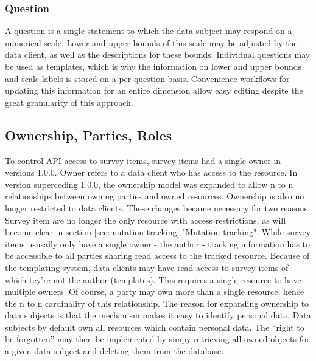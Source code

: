 \documentclass[a4paper,11pt]{article}
\begin{document}
                \subsubsection{Question}
                    A question is a single statement to which the data subject may respond
                    on a numerical scale. Lower and upper bounds of this scale
                    may be adjusted by the data client, as well as the descriptions
                    for these bounds. Individual questions may be used as templates,
                    which is why the information on lower and upper bounds and scale
                    labels is stored on a per-question basis. Convenience workflows
                    for updating this information for an entire dimension allow
                    easy editing despite the great granularity of this approach.

            \subsection{Ownership, Parties, Roles}
                To control API access to survey items, survey items had a single
                owner in versions 1.0.0. Owner refers to a data client who has access
                to the resource. In version superceding 1.0.0, the ownership model
                was expanded to allow n to n relationships between owning parties
                and owned resources. Ownership is also no longer restricted to
                data clients. These changes became necessary for two reasons.
                Survey item are no longer the only resource with access restrictions,
                as will become clear in section \ref{sec:mutation-tracking} "Mutation tracking".
                While survey items ususally only have a single owner - the author - 
                tracking information has to be accessible to all parties sharing
                read access to the tracked resource. Because of the templating system,
                data clients may have read access to survey items of which tey're not
                the author (templates). This requires a single resource to have multiple owners.
                Of course, a party may own more than a single resource, hence the n to n
                cardinality of this relationship. The reason for expanding ownership
                to data subjects is that the mechanism makes it easy to identify personal
                data. Data subjects by default own all resources which contain
                personal data. The ``right to be forgotten'' may then be implemented by
                simpy retrieving all owned objects for a given data subject and deleting 
                them from the database.
\end{document}
